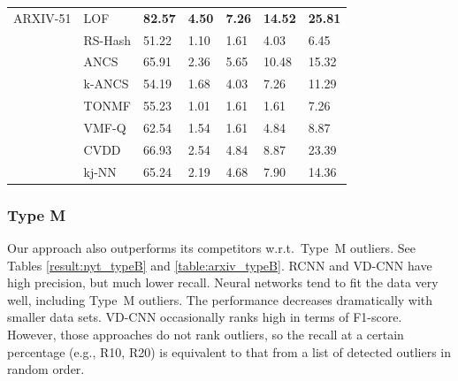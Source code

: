 \begin{table}
\begin{tabularx}{\columnwidth}{@{}XXXXXXX@{}}
ARXIV-51 & \gls{LOF}     & \bfseries82.57 &\bfseries	4.50 	&\bfseries7.26  &\bfseries	14.52 &\bfseries 	25.81 \\
         & \gls{RS-Hash} & 51.22 & 1.10  & 1.61  & 4.03  & 6.45  \\
         & \gls{ANCS}     & 65.91 & 2.36  & 5.65  & 10.48 & 15.32 \\
         & \gls{k-ANCS}   & 54.19 &	1.68 &	4.03 &	7.26 &	11.29 	 \\
         & \gls{TONMF}   & 55.23  &	1.01 &	1.61 &	1.61 &	7.26   \\
         & \gls{VMF-Q}   & 62.54 & 1.54  & 1.61  & 4.84  & 8.87  \\
         & \gls{CVDD}     & 66.93	 & 2.54	 & 4.84	& 8.87 &	23.39  \\
         & \gls{kj-NN}   & 65.24 	& 2.19 &	4.68 &	7.90  & 14.36 \\ \bottomrule
\end{tabularx}
\end{table}

\subsubsection{Type M} Our approach also outperforms its competitors w.r.t.\ Type~M outliers. See Tables \ref{result:nyt_typeB} and \ref{table:arxiv_typeB}. 
\gls{RCNN} and \gls{VD-CNN} have high precision, but much lower recall. Neural networks tend to fit the data very well, including Type~M outliers. The performance decreases dramatically with smaller data sets. \gls{VD-CNN} occasionally ranks high in terms of F1-score. However, those approaches do not rank outliers, so the recall at a certain percentage (e.g., R10, R20) is equivalent to that from a list of detected outliers in random order.


